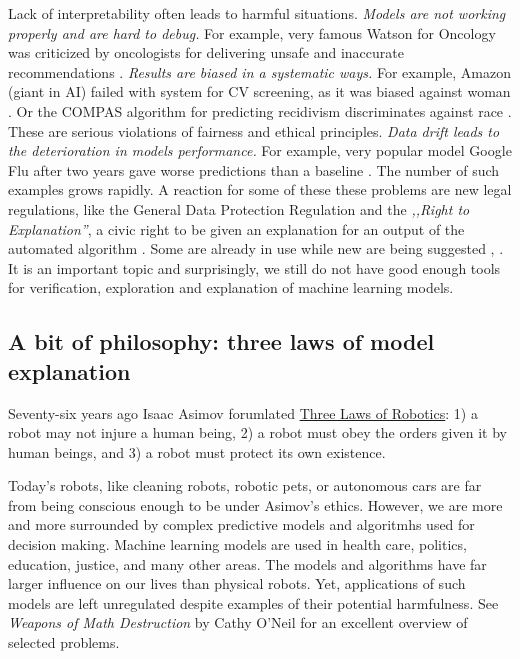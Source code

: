 \documentclass[12pt,]{krantz}
\theoremstyle{definition}
\theoremstyle{definition}
\theoremstyle{definition}
\theoremstyle{remark}
\begin{document}
Lack of interpretability often leads to harmful situations. \emph{Models
are not working properly and are hard to debug.} For example, very
famous Watson for Oncology was criticized by oncologists for delivering
unsafe and inaccurate recommendations \citep{IBMWatson}. \emph{Results
are biased in a systematic ways.} For example, Amazon (giant in AI)
failed with system for CV screening, as it was biased against woman
\citep{AmazonAI}. Or the COMPAS algorithm for predicting recidivism
discriminates against race \citep{COMPAS}. These are serious violations
of fairness and ethical principles. \emph{Data drift leads to the
deterioration in models performance.} For example, very popular model
Google Flu after two years gave worse predictions than a baseline
\citep{GoogleFLU}. The number of such examples grows rapidly. A reaction
for some of these these problems are new legal regulations, like the
General Data Protection Regulation \citep{EUGDPR} and the \emph{,,Right
to Explanation''}, a civic right to be given an explanation for an
output of the automated algorithm \citep{RightToExpl}. Some are already
in use while new are being suggested \citep{RightToExpl2},
\citep{RightToExpl3}. It is an important topic and surprisingly, we
still do not have good enough tools for verification, exploration and
explanation of machine learning models.

\hypertarget{three-single-laws}{%
\subsection{A bit of philosophy: three laws of model
explanation}\label{three-single-laws}}

Seventy-six years ago Isaac Asimov forumlated
\href{https://en.wikipedia.org/wiki/Three_Laws_of_Robotics}{Three Laws
of Robotics}: 1) a robot may not injure a human being, 2) a robot must
obey the orders given it by human beings, and 3) a robot must protect
its own existence.

Today's robots, like cleaning robots, robotic pets, or autonomous cars
are far from being conscious enough to be under Asimov's ethics.
However, we are more and more surrounded by complex predictive models
and algoritmhs used for decision making. Machine learning models are
used in health care, politics, education, justice, and many other areas.
The models and algorithms have far larger influence on our lives than
physical robots. Yet, applications of such models are left unregulated
despite examples of their potential harmfulness. See \emph{Weapons of
Math Destruction} by Cathy O'Neil \citep{ONeil} for an excellent
overview of selected problems.
\end{document}
